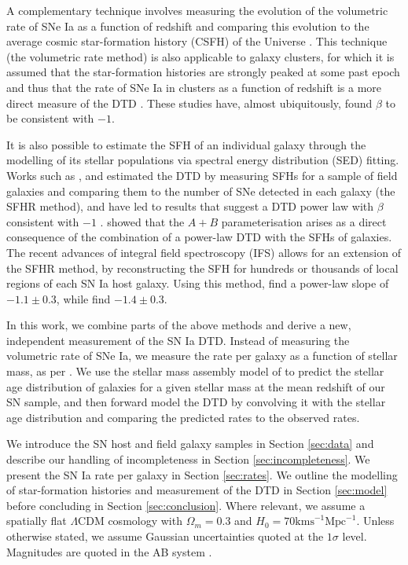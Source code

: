 \documentclass[fleqn,usenatbib]{mnras}
\begin{document}
A complementary technique involves measuring the evolution of the volumetric rate of SNe Ia as a function of redshift and comparing this evolution to the average cosmic star-formation history (CSFH) of the Universe \citep{Gal-Yam2004,Strolger2004,Dahlen2004,Dahlen2008, Graur2018, Frohmaier2019}. This technique (the volumetric rate method) is also applicable to galaxy clusters, for which it is assumed that the star-formation histories are strongly peaked at some past epoch and thus that the rate of SNe Ia in clusters as a function of redshift is a more direct measure of the DTD \citep{Maoz2004,Graur2014,Maoz2014}. These studies have, almost ubiquitously, found $\beta$ to be consistent with $-1$.

It is also possible to estimate the SFH of an individual galaxy through the modelling of its stellar populations via spectral energy distribution (SED) fitting. Works such as \citet{Maoz2011}, \citet{Maoz2012} and \citet{Graur2013} estimated the DTD by measuring SFHs for a sample of field galaxies and comparing them to the number of SNe detected in each galaxy (the SFHR method), and have led to results that suggest a DTD power law with $\beta$ consistent with $-1$ \citep[e.g.][]{Maoz2011,Graur2013}. \citet{Childress2014} showed that the $A+B$ parameterisation arises as a direct consequence of the combination of a power-law DTD with the SFHs of galaxies. The recent advances of integral field spectroscopy (IFS) allows for an extension of the SFHR method, by reconstructing the SFH for hundreds or thousands of local regions of each SN Ia host galaxy. Using this method, \citet{Castrillo2020} find a power-law slope of $-1.1\pm0.3$, while \citet{Shen2021} find $-1.4\pm0.3$.

In this work, we combine parts of the above methods and derive a new, independent measurement of the SN Ia DTD. Instead of measuring the volumetric rate of SNe Ia, we measure the rate per galaxy as a function of stellar mass, as per \citet{Sullivan2006,Smith2012}. We use the stellar mass assembly model of \citet{Childress2014} to predict the stellar age distribution of galaxies for a given stellar mass at the mean redshift of our SN sample, and then forward model the DTD by convolving it with the stellar age distribution and comparing the predicted rates to the observed rates.

We introduce the SN host and field galaxy samples in Section \ref{sec:data} and describe our handling of incompleteness in Section \ref{sec:incompleteness}. We present the SN Ia rate per galaxy in Section \ref{sec:rates}. We outline the modelling of star-formation histories and measurement of the DTD in Section \ref{sec:model} before concluding in Section \ref{sec:conclusion}.
Where relevant, we assume a spatially flat $\Lambda$CDM cosmology with $\Omega_m = 0.3$ and $H_0 = 70 \mathrm{ km s}^{-1}\mathrm{Mpc}^{-1}$. Unless otherwise stated, we assume Gaussian uncertainties quoted at the $1\sigma$ level. Magnitudes are quoted in the AB system \citep{Oke1983}.
\end{document}
